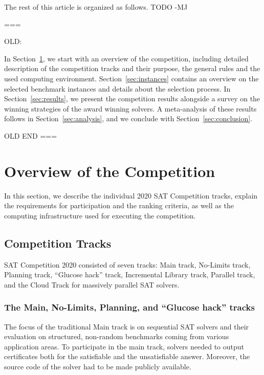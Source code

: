 \documentclass{elsarticle}
\begin{document}
The rest of this article is organized as follows. TODO -MJ

===

OLD:

In Section~\ref{sec:overview}, we start with an overview of the competition,
including detailed description of the competition tracks and their purpose,
the general rules and the used computing environment.
Section~\ref{sec:instances} contains an overview on the selected benchmark instances and details about the selection process. 
In Section~\ref{sec:results}, we present the competition results alongside a survey on the winning strategies of the award winning solvers. 
A meta-analysis of these results follows in Section~\ref{sec:analysis}, and we conclude with Section~\ref{sec:conclusion}.

OLD END ===

\section{Overview of the Competition}
\label{sec:overview}

In this section, we describe the individual 2020 SAT Competition tracks,
explain the requirements for participation %
and the ranking criteria, as well as
the computing infrastructure used for executing the competition.

\subsection{Competition Tracks}

SAT Competition 2020 consisted of seven tracks:
Main track, No-Limits track, Planning track, ``Glucose hack'' track,
Incremental Library track, Parallel track,
and the Cloud Track for massively parallel SAT solvers. %

\subsubsection{The Main, No-Limits, Planning, and ``Glucose hack'' tracks}

The focus of the traditional Main track is on sequential SAT solvers and their evaluation on structured, non-random benchmarks coming from various application areas. To participate in the main track, solvers needed to output certificates both for the satisfiable and the unsatisfiable answer. Moreover, the source code of the solver had to be made publicly available. 
\end{document}
